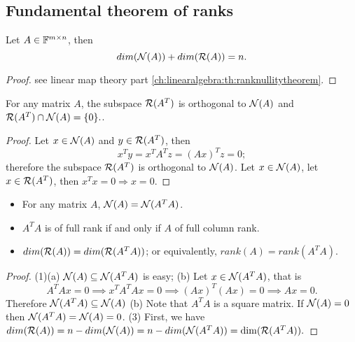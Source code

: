 \begin{refsection}
\subsection{Fundamental theorem of ranks}
\begin{theorem}\label{ch:linearalgebra:th:rankNullitytheorem}
	Let $A \in \mathbb{F}^{m \times n}$, then
	$$dim(\mathcal{N}(A)) + dim(\mathcal{R}(A)) = n.$$
\end{theorem}
\begin{proof}
	see linear map theory part \autoref{ch:linearalgebra:th:ranknullitytheorem}.
\end{proof}


\begin{lemma}
	\cite[102]{banerjee2014linear} 
	For any matrix $A$, the subspace $\mathcal{R}(A^T)$ is orthogonal to $\mathcal{N}(A)$ and $\mathcal{R}(A^T)\cap \mathcal{N}(A) = \{0\}.$.
\end{lemma}
\begin{proof}
	Let $x \in \mathcal{N}(A)$ and  $y\in \mathcal{R}(A^T)$, then 
	$$x^Ty = x^TA^Tz = (Ax)^Tz = 0;$$
	therefore the subspace $\mathcal{R}(A^T)$ is orthogonal to $\mathcal{N}(A)$. Let $x \in \mathcal{N}(A)$, let $x\in \mathcal{R}(A^T)$, then $x^Tx = 0 \Rightarrow x = 0$. 
\end{proof}


\begin{lemma}\label{ch:linearalgebra:rankPropertyofXTXmatrix}
	\cite[102]{banerjee2014linear} \hfill
\begin{itemize}
	\item For any matrix $A$, $\mathcal{N}(A) = \mathcal{N}(A^TA)$.
	\item $A^TA$ is of full rank if and only if $A$ of full column rank. 
	\item  $dim(\mathcal{R}(A)) = dim(\mathcal{R}(A^TA))$; or equivalently, $rank(A)=rank(A^TA)$.
\end{itemize}	
\end{lemma}
\begin{proof}
	(1)(a) $\mathcal{N}(A) \subseteq \mathcal{N}(A^TA)$ is easy; (b) Let $x \in \mathcal{N}(A^TA)$, that is $$A^TAx = 0 \implies x^TA^TAx = 0 \implies (Ax)^T(Ax) = 0 \implies Ax = 0.$$
	Therefore $\mathcal{N}(A^TA) \subseteq \mathcal{N}(A)$
	(b) Note that $A^TA$ is a square matrix. If $\mathcal{N}(A) = 0$ then $\mathcal{N}(A^TA) = \mathcal{N}(A) = 0$.
	(3) 	First, we have $dim(\mathcal{R}(A)) = n - dim(\mathcal{N}(A)) = n - dim(\mathcal{N}(A^TA)) =\dim(\mathcal{R}(A^TA)). $
\end{proof}



\end{refsection}
